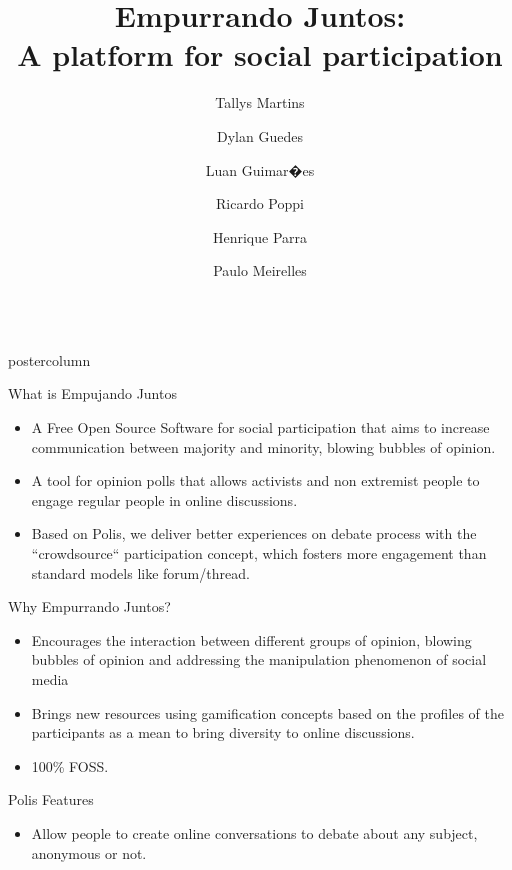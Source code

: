 \documentclass[final,hyperref={pdfpagelabels=false}]{beamer}
\title{\huge\bfseries\hspace*{-1em} Empurrando Juntos: \\A platform for social participation}
\date{}
\author{\large Tallys Martins
\and Dylan Guedes
\and Luan Guimar�es \\
\and Ricardo Poppi
\and Henrique Parra
\and Paulo Meirelles
}
\institute[UNB/CD]{University of Bras�lia and Cidade Democr�tica NGO, Brazil}
\newlength{\columnheight}
\begin{document}
\begin{frame}
  \begin{columns}
    \begin{column}{.49\textwidth}
      \begin{beamercolorbox}[center,wd=\textwidth]{postercolumn}
        \begin{minipage}[T]{.95\textwidth}
          \parbox[t][\columnheight]{\textwidth}{

\begin{block}{What is Empujando Juntos}

  \begin{itemize}
    \item A Free Open Source Software for social participation that aims to
    increase communication between majority and minority, blowing bubbles of
    opinion.

    \item A tool for opinion polls that allows activists and non extremist people
    to engage regular people in online discussions.

    \item Based on Polis, we deliver better experiences on debate process
    with the ``crowdsource`` participation concept, which fosters
    more engagement than standard models like forum/thread.
  \end{itemize}
\end{block}

\begin{block}{Why Empurrando Juntos?}
  \begin{itemize}
    \item Encourages the interaction between different groups of opinion, blowing
    bubbles of opinion and addressing the manipulation phenomenon of social media

    \item Brings new resources using gamification concepts based on the profiles
    of the participants as a mean to bring diversity to online discussions.

    \item 100\% FOSS.
  \end{itemize}
\end{block}

\begin{block}{Polis Features}
  \begin{itemize}
    \item Allow people to create online conversations to debate about any subject,
    anonymous or not.


\end{itemize}
\end{block}}
\end{minipage}
\end{beamercolorbox}
\end{column}
\end{columns}
\end{frame}
\end{document}
